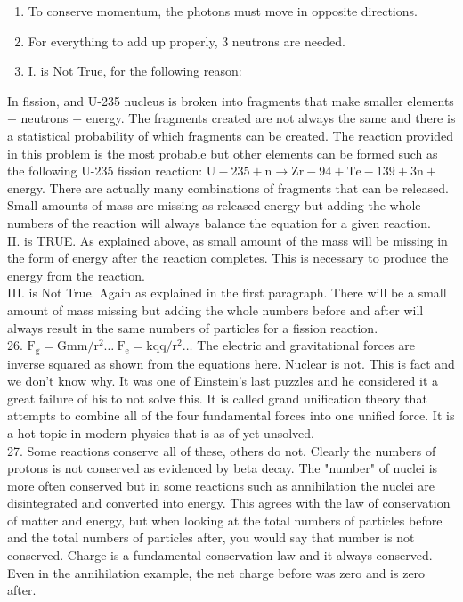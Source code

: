 \begin{enumerate}
\begin{enumerate}
  \item To conserve momentum, the photons must move in opposite directions.
  \item For everything to add up properly, 3 neutrons are needed.
  \item I. is Not True, for the following reason:
\end{enumerate}

In fission, and U-235 nucleus is broken into fragments that make smaller elements + neutrons + energy. The fragments created are not always the same and there is a statistical probability of which fragments can be created. The reaction provided in this problem is the most probable but other elements can be formed such as the following U-235 fission reaction: $\mathrm{U}-235+\mathrm{n} \rightarrow \mathrm{Zr}-94+\mathrm{Te}-139+3 \mathrm{n}+$ energy. There are actually many combinations of fragments that can be released. Small amounts of mass are missing as released energy but adding the whole numbers of the reaction will always balance the equation for a given reaction.\\
II. is TRUE. As explained above, as small amount of the mass will be missing in the form of energy after the reaction completes. This is necessary to produce the energy from the reaction.\\
III. is Not True. Again as explained in the first paragraph. There will be a small amount of mass missing but adding the whole numbers before and after will always result in the same numbers of particles for a fission reaction.\\
26. $\mathrm{F}_{\mathrm{g}}=\mathrm{Gmm} / \mathrm{r}^{2} \ldots \mathrm{~F}_{\mathrm{e}}=\mathrm{kqq} / \mathrm{r}^{2} \ldots$ The electric and gravitational forces are inverse squared as shown from the equations here. Nuclear is not. This is fact and we don't know why. It was one of Einstein's last puzzles and he considered it a great failure of his to not solve this. It is called grand unification theory that attempts to combine all of the four fundamental forces into one unified force. It is a hot topic in modern physics that is as of yet unsolved.\\
27. Some reactions conserve all of these, others do not. Clearly the numbers of protons is not conserved as evidenced by beta decay. The "number" of nuclei is more often conserved but in some reactions such as annihilation the nuclei are disintegrated and converted into energy. This agrees with the law of conservation of matter and energy, but when looking at the total numbers of particles before and the total numbers of particles after, you would say that number is not conserved. Charge is a fundamental conservation law and it always conserved. Even in the annihilation example, the net charge before was zero and is zero after.\\

\end{enumerate}
